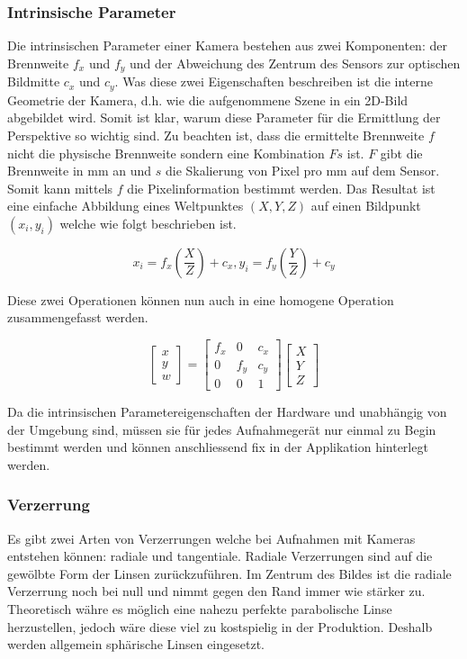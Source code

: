 \documentclass[main.tex]{subfiles}
\begin{document}
\subsubsection{Intrinsische Parameter}
Die intrinsischen Parameter einer Kamera bestehen aus zwei Komponenten: der Brennweite $f_x$ und $f_y$ und der Abweichung des Zentrum des Sensors zur optischen Bildmitte $c_x$ und $c_y$. Was diese zwei Eigenschaften beschreiben ist die interne Geometrie der Kamera, d.h. wie die aufgenommene Szene in ein 2D-Bild abgebildet wird. Somit ist klar, warum diese Parameter für die Ermittlung der Perspektive so wichtig sind. Zu beachten ist, dass die ermittelte Brennweite $f$ nicht die physische Brennweite sondern eine Kombination $Fs$ ist. $F$ gibt die Brennweite in mm an und $s$ die Skalierung von Pixel pro mm auf dem Sensor. Somit kann mittels $f$ die Pixelinformation bestimmt werden. Das Resultat ist eine einfache Abbildung eines Weltpunktes $(X, Y, Z)$ auf einen Bildpunkt $(x_i, y_i)$ welche wie folgt beschrieben ist.

\begin{equation}
x_i = f_x (\frac{X}{Z}) + c_x,   y_i = f_y (\frac{Y}{Z}) + c_y
\end{equation}

Diese zwei Operationen können nun auch in eine homogene Operation zusammengefasst werden.

\begin{equation}
\begin{bmatrix}
x \\ y \\ w
\end{bmatrix} 
=
\begin{bmatrix}
f_x & 0 & c_x \\
0 & f_y & c_y \\
0 & 0 & 1
\end{bmatrix} 
\begin{bmatrix}
X \\ Y \\ Z
\end{bmatrix} 
\end{equation}

Da die intrinsischen Parametereigenschaften der Hardware und unabhängig von der Umgebung sind, müssen sie für jedes Aufnahmegerät nur einmal zu Begin bestimmt werden und können anschliessend fix in der Applikation hinterlegt werden.

\subsubsection{Verzerrung}
Es gibt zwei Arten von Verzerrungen welche bei Aufnahmen mit Kameras entstehen können: radiale und tangentiale. Radiale Verzerrungen sind auf die gewölbte Form der Linsen zurückzuführen. Im Zentrum des Bildes ist die radiale Verzerrung noch bei null und nimmt gegen den Rand immer wie stärker zu. Theoretisch währe es möglich eine nahezu perfekte parabolische Linse herzustellen, jedoch wäre diese viel zu kostspielig in der Produktion. Deshalb werden allgemein sphärische Linsen eingesetzt.
\end{document}
